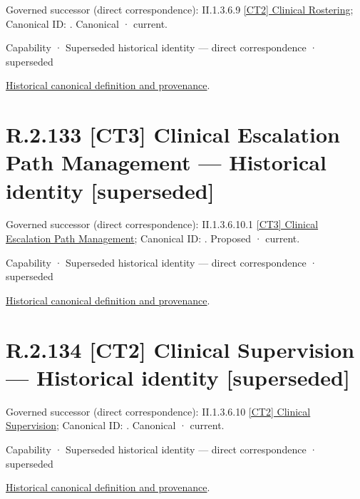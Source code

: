 {\small Governed successor (direct correspondence): II.1.3.6.9 \hyperref[element:192ca88a289544dcbf6adaf643f39969]{[CT2] Clinical Rostering}; Canonical ID: \texttt{}. Canonical · current.}\par
\label{element:b6527516a69c499d8cc9c8fe881169fe}
{\small Capability · Superseded historical identity — direct correspondence · superseded}\par
\href{../../../../continuum/strategy/capability/b6527516a69c499d8cc9c8fe881169fe.md}{Historical canonical definition and provenance}.\par
\section*{R.2.133 [CT3] Clinical Escalation Path Management — Historical identity [superseded]}
\label{navigation:R.2.133}

{\small Governed successor (direct correspondence): II.1.3.6.10.1 \hyperref[element:cca86a32ba8c4dda84caeaa248e9f444]{[CT3] Clinical Escalation Path Management}; Canonical ID: \texttt{}. Proposed · current.}\par
\label{element:759a2e52172345e8ad1bc96d7e5ddad3}
{\small Capability · Superseded historical identity — direct correspondence · superseded}\par
\href{../../../../continuum/strategy/capability/759a2e52172345e8ad1bc96d7e5ddad3.md}{Historical canonical definition and provenance}.\par
\section*{R.2.134 [CT2] Clinical Supervision — Historical identity [superseded]}
\label{navigation:R.2.134}

{\small Governed successor (direct correspondence): II.1.3.6.10 \hyperref[element:f697b1ac79b544749315f31819b17969]{[CT2] Clinical Supervision}; Canonical ID: \texttt{}. Canonical · current.}\par
\label{element:50c838981f3946d78e8f78d18e31c70c}
{\small Capability · Superseded historical identity — direct correspondence · superseded}\par
\href{../../../../continuum/strategy/capability/50c838981f3946d78e8f78d18e31c70c.md}{Historical canonical definition and provenance}.\par
